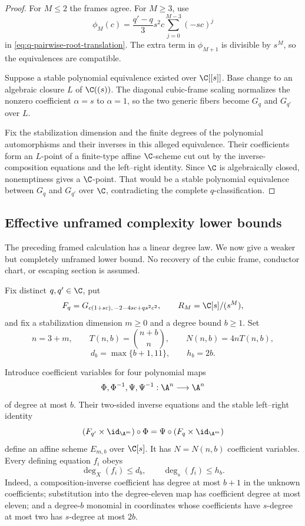 \begin{proof}
For \(M\le2\) the frames agree.  For \(M\ge3\), use
\[
 \phi_M(c)=\frac{q'-q}{3}s^2c
 \sum_{j=0}^{M-3}(-sc)^j
\]
in \eqref{eq:q-pairwise-root-translation}.  The extra term in
\(\phi_{M+1}\) is divisible by \(s^M\), so the equivalences are compatible.

Suppose a stable polynomial equivalence existed over \(\C[[s]]\).  Base
change to an algebraic closure \(L\) of \(\C((s))\).  The diagonal
cubic-frame scaling normalizes the nonzero coefficient \(\alpha=s\) to
\(\alpha=1\), so the two generic fibers become \(G_q\) and \(G_{q'}\)
over \(L\).

Fix the stabilization dimension and the finite degrees of the polynomial
automorphisms and their inverses in this alleged equivalence.  Their
coefficients form an \(L\)-point of a finite-type affine \(\C\)-scheme cut
out by the inverse-composition equations and the left--right identity.  Since
\(\C\) is algebraically closed, nonemptiness gives a \(\C\)-point.  That
would be a stable polynomial equivalence between \(G_q\) and \(G_{q'}\)
over \(\C\), contradicting the complete \(q\)-classification.
\end{proof}

\subsection{Effective unframed complexity lower bounds}
\label{subsec:q-effective-unframed-bound}

The preceding framed calculation has a linear degree law.  We now give a
weaker but completely unframed lower bound.  No recovery of the cubic frame,
conductor chart, or escaping section is assumed.

Fix distinct \(q,q'\in\C\), put
\[
 F_q=G_{c(1+sc),\,-2-4sc+qs^2c^2},
 \qquad R_M=\C[s]/(s^M),
\]
and fix a stabilization dimension \(m\ge0\) and a degree bound \(b\ge1\).
Set
\[
 n=3+m,\qquad
 T(n,b)=\binom{n+b}{n},\qquad
 N(n,b)=4nT(n,b),
\]
\[
 d_b=\max\{b+1,11\},\qquad h_b=2b.
\]

Introduce coefficient variables for four polynomial maps
\[
 \Phi,\Phi^{-1},\Psi,\Psi^{-1}:\A^n\longrightarrow\A^n
\]
of degree at most \(b\).  Their two-sided inverse equations and the stable
left--right identity
\[
 (F_{q'}\times\id_{\A^m})\circ\Phi
 =\Psi\circ(F_q\times\id_{\A^m})
\]
define an affine scheme \(E_{m,b}\) over \(\C[s]\).  It has
\(N=N(n,b)\) coefficient variables.  Every defining equation \(f_i\) obeys
\[
 \deg_X(f_i)\le d_b,
 \qquad
 \deg_s(f_i)\le h_b.
\]
Indeed, a composition-inverse coefficient has degree at most \(b+1\) in the
unknown coefficients; substitution into the degree-eleven map has coefficient
degree at most eleven; and a degree-\(b\) monomial in coordinates whose
coefficients have \(s\)-degree at most two has \(s\)-degree at most \(2b\).

